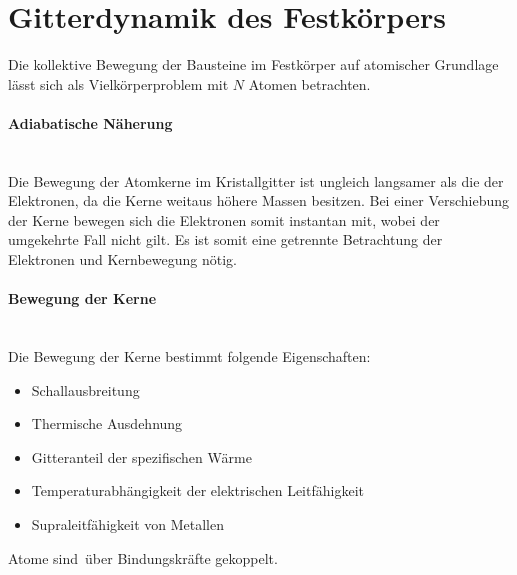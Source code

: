 \setcounter{section}{4}

\section{Gitterdynamik des Festkörpers}
	Die kollektive Bewegung der Bausteine im Festkörper auf atomischer Grundlage lässt sich als Vielkörperproblem mit $N$ Atomen betrachten.

\paragraph{Adiabatische Näherung}\,\\
	Die Bewegung der Atomkerne im Kristallgitter ist ungleich langsamer als die der Elektronen, da die Kerne weitaus höhere Massen besitzen. 
	Bei einer Verschiebung der Kerne bewegen sich die Elektronen somit instantan mit, wobei der umgekehrte Fall nicht gilt. 
	Es ist somit eine getrennte Betrachtung der Elektronen und Kernbewegung nötig.

\paragraph{Bewegung der Kerne}\,\\
	Die Bewegung der Kerne bestimmt folgende Eigenschaften:
	\begin{itemize}
		\item Schallausbreitung
		\item Thermische Ausdehnung
		\item Gitteranteil der spezifischen Wärme
		\item Temperaturabhängigkeit der elektrischen Leitfähigkeit
		\item Supraleitfähigkeit von Metallen
	\end{itemize}
Atome sind über Bindungskräfte gekoppelt.


